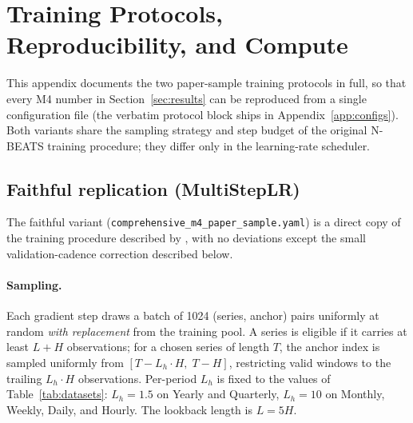 %
%

\section{Training Protocols, Reproducibility, and Compute}
\label{app:protocol}

This appendix documents the two paper-sample training protocols in full,
so that every M4 number in Section~\ref{sec:results} can be reproduced
from a single configuration file (the verbatim protocol block ships in
Appendix~\ref{app:configs}). Both variants share the sampling strategy and
step budget of the original N-BEATS training procedure;
they differ only in the learning-rate scheduler.

\subsection{Faithful replication (MultiStepLR)}
\label{app:protocol:faithful}

The faithful variant (\texttt{comprehensive\_m4\_paper\_sample.yaml}) is a
direct copy of the training procedure described by
\citet[Section~5.2 and Appendix~D]{oreshkin2020nbeats}, with no deviations
except the small validation-cadence correction described below.

\paragraph{Sampling.} Each gradient step draws a batch of 1024
(series, anchor) pairs uniformly at random \emph{with replacement} from the
training pool. A series is eligible if it carries at least $L + H$
observations; for a chosen series of length $T$, the anchor index is
sampled uniformly from $[T - L_h \cdot H,\; T - H]$, restricting valid
windows to the trailing $L_h \cdot H$ observations. Per-period $L_h$ is
fixed to the values of Table~\ref{tab:datasets}: $L_h = 1.5$ on Yearly and
Quarterly, $L_h = 10$ on Monthly, Weekly, Daily, and Hourly. The lookback
length is $L = 5H$.

